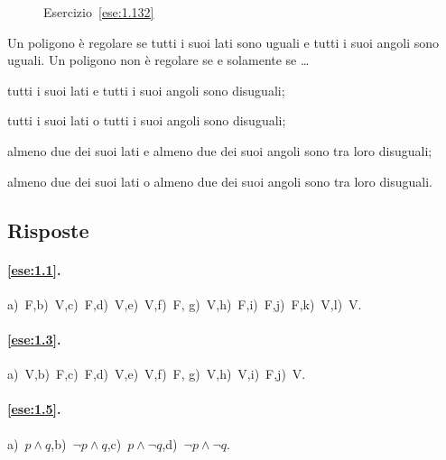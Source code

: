 \begin{inaccessibleblock}
 \begin{figure}[htb]
 \centering
 \caption{Esercizio~\ref{ese:1.132}}\label{fig:ese1.132}
\end{figure}
\end{inaccessibleblock}


\begin{esercizio}
\label{ese:1.133}
Un poligono è regolare se tutti i suoi lati sono uguali e tutti i 
suoi angoli sono uguali. Un poligono non è regolare se e solamente se 
\ldots
\begin{enumeratea}
\item tutti i suoi lati e tutti i suoi angoli sono disuguali;
\item tutti i suoi lati o tutti i suoi angoli sono disuguali;
\item almeno due dei suoi lati e almeno due dei suoi angoli sono tra 
loro disuguali;
\item almeno due dei suoi lati o almeno due dei suoi angoli sono tra 
loro disuguali.
\end{enumeratea}
\end{esercizio}


\subsection{Risposte}

\begingroup
\hypersetup{linkcolor=black}

\paragraph{\ref{ese:1.1}.}
a)~F,\quad b)~V,\quad c)~F,\quad d)~V,\quad e)~V,\quad f)~F,\quad 
g)~V,\quad h)~F,\quad i)~F,\quad j)~F,\quad k)~V,\quad l)~V.

\paragraph{\ref{ese:1.3}.}
a)~V,\quad b)~F,\quad c)~F,\quad d)~V,\quad e)~V,\quad f)~F,\quad 
g)~V,\quad h)~V,\quad i)~F,\quad j)~V.

\paragraph{\ref{ese:1.5}.}
a)~\(p\wedge q\),\quad b)~\(\neg p\wedge q\),\quad c)~\(p\wedge \neg 
q\),\quad d)~\(\neg p \wedge \neg q\).

